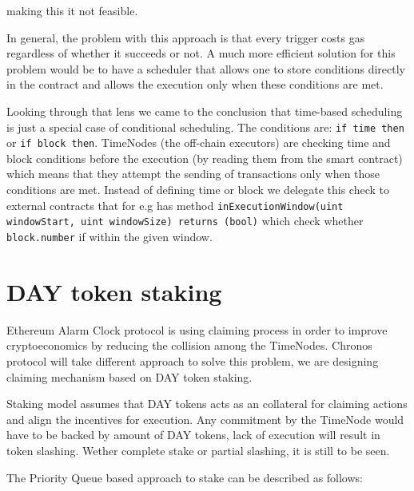 \documentclass{report}
\begin{document}
  making this it not feasible.

  In general, the problem with this approach is that every trigger costs gas regardless of whether it succeeds or not. A much more efficient solution for this problem would be to have a scheduler that allows one to store conditions directly in the contract and allows the execution only when these conditions are met.
  
  Looking through that lens we came to the conclusion that time-based scheduling is just a special case of conditional scheduling. The conditions are: \texttt{if time then} or \texttt{if block then}. TimeNodes (the off-chain executors) are checking time and block conditions before the execution (by reading them from the smart contract) which means that they attempt the sending of transactions only when those conditions are met. Instead of defining time or block we delegate this check to external contracts that for e.g has method \texttt{inExecutionWindow(uint windowStart, uint windowSize) returns (bool)} which check whether \texttt{block.number} if within the given window.

  \section{DAY token staking}

  Ethereum Alarm Clock protocol is using claiming process in order to improve cryptoeconomics by reducing the collision among the TimeNodes. Chronos protocol will take different approach to solve this problem, we are designing claiming mechanism based on DAY token staking.

  Staking model assumes that DAY tokens acts as an collateral for claiming actions and align the incentives for execution. Any commitment by the TimeNode would have to be backed by amount of DAY tokens, lack of execution will result in token slashing. Wether complete stake or partial slashing, it is still to be seen.

  The Priority Queue based approach to stake can be described as follows:
\end{document}

